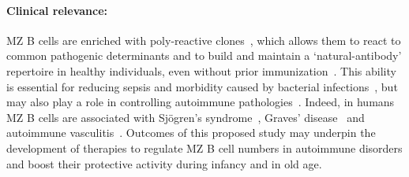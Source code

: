 \documentclass[11pt]{article}
\newcommand{\para}[1]{\vspace*{-4.5mm}\paragraph{#1}}
\begin{document}
\para{Clinical relevance:}
MZ B cells are enriched with poly-reactive clones~\cite{Chen_1997, Dammers_2000, Bendelac_2001, Zouali_2011, Hendricks_2018}, which allows them to react to common pathogenic determinants and to build and maintain a `natural-antibody' repertoire in healthy individuals, even without prior immunization~\cite{Briles_1981,   Cerutti_2013, Reynolds_2014, Kearney_2015, Chen_2018,  Cyster_2019, Stewart_New_2020}.
This ability is essential for reducing sepsis and morbidity caused by bacterial infections~\cite{Amlot_1985, Brigden_1999, Guinamard_2000, Castagnola_2003,  Kruetzmann_2003, Kruschinski_2004, Sagaert_2007}, but may also play a role in controlling autoimmune pathologies~\cite{Palm_2021}.
Indeed, in humans MZ B cells are associated with Sjögren's syndrome~\cite{Daridon_2006, Guerrier_2012},  Graves' disease~\cite{Segundo_2001} and autoimmune vasculitis~\cite{Appelgren_2018}. %
Outcomes of this proposed study may underpin the development of therapies to regulate MZ B cell numbers in autoimmune disorders and boost their protective activity during infancy and in old age.  

\vspace{-2mm}
\end{document}
